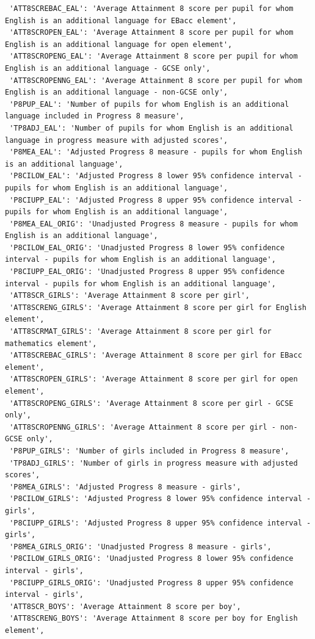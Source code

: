 \documentclass[
  letterpaper,
  DIV=11,
  numbers=noendperiod]{scrartcl}
\begin{document}
\begin{verbatim}
 'ATT8SCREBAC_EAL': 'Average Attainment 8 score per pupil for whom English is an additional language for EBacc element',
 'ATT8SCROPEN_EAL': 'Average Attainment 8 score per pupil for whom English is an additional language for open element',
 'ATT8SCROPENG_EAL': 'Average Attainment 8 score per pupil for whom English is an additional language - GCSE only',
 'ATT8SCROPENNG_EAL': 'Average Attainment 8 score per pupil for whom English is an additional language - non-GCSE only',
 'P8PUP_EAL': 'Number of pupils for whom English is an additional language included in Progress 8 measure',
 'TP8ADJ_EAL': 'Number of pupils for whom English is an additional language in progress measure with adjusted scores',
 'P8MEA_EAL': 'Adjusted Progress 8 measure - pupils for whom English is an additional language',
 'P8CILOW_EAL': 'Adjusted Progress 8 lower 95% confidence interval - pupils for whom English is an additional language',
 'P8CIUPP_EAL': 'Adjusted Progress 8 upper 95% confidence interval - pupils for whom English is an additional language',
 'P8MEA_EAL_ORIG': 'Unadjusted Progress 8 measure - pupils for whom English is an additional language',
 'P8CILOW_EAL_ORIG': 'Unadjusted Progress 8 lower 95% confidence interval - pupils for whom English is an additional language',
 'P8CIUPP_EAL_ORIG': 'Unadjusted Progress 8 upper 95% confidence interval - pupils for whom English is an additional language',
 'ATT8SCR_GIRLS': 'Average Attainment 8 score per girl',
 'ATT8SCRENG_GIRLS': 'Average Attainment 8 score per girl for English element',
 'ATT8SCRMAT_GIRLS': 'Average Attainment 8 score per girl for mathematics element',
 'ATT8SCREBAC_GIRLS': 'Average Attainment 8 score per girl for EBacc element',
 'ATT8SCROPEN_GIRLS': 'Average Attainment 8 score per girl for open element',
 'ATT8SCROPENG_GIRLS': 'Average Attainment 8 score per girl - GCSE only',
 'ATT8SCROPENNG_GIRLS': 'Average Attainment 8 score per girl - non-GCSE only',
 'P8PUP_GIRLS': 'Number of girls included in Progress 8 measure',
 'TP8ADJ_GIRLS': 'Number of girls in progress measure with adjusted scores',
 'P8MEA_GIRLS': 'Adjusted Progress 8 measure - girls',
 'P8CILOW_GIRLS': 'Adjusted Progress 8 lower 95% confidence interval - girls',
 'P8CIUPP_GIRLS': 'Adjusted Progress 8 upper 95% confidence interval - girls',
 'P8MEA_GIRLS_ORIG': 'Unadjusted Progress 8 measure - girls',
 'P8CILOW_GIRLS_ORIG': 'Unadjusted Progress 8 lower 95% confidence interval - girls',
 'P8CIUPP_GIRLS_ORIG': 'Unadjusted Progress 8 upper 95% confidence interval - girls',
 'ATT8SCR_BOYS': 'Average Attainment 8 score per boy',
 'ATT8SCRENG_BOYS': 'Average Attainment 8 score per boy for English element',

\end{verbatim}
\end{document}
